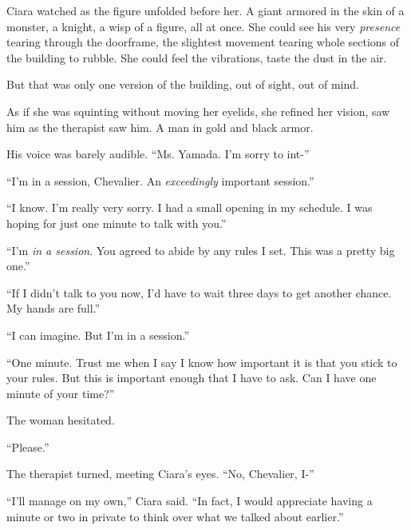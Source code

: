 Ciara watched as the figure unfolded before her.  A giant armored in the skin of a monster, a knight, a wisp of a figure, all at once.  She could see his very \emph{presence} tearing through the doorframe, the slightest movement tearing whole sections of the building to rubble.  She could feel the vibrations, taste the dust in the air.



But that was only one version of the building, out of sight, out of mind.



As if she was squinting without moving her eyelids, she refined her vision, saw him as the therapist saw him.  A man in gold and black armor.



His voice was barely audible.  ``Ms. Yamada.  I'm sorry to int-''



``I'm in a session, Chevalier.  An \emph{exceedingly} important session.''



``I know.  I'm really very sorry.  I had a small opening in my schedule.  I was hoping for just one minute to talk with you.''



``I'm \emph{in a session}.  You agreed to abide by any rules I set.  This was a pretty big one.''



``If I didn't talk to you now, I'd have to wait three days to get another chance.  My hands are full.''



``I can imagine.  But I'm in a session.''



``One minute.  Trust me when I say I know how important it is that you stick to your rules.  But this is important enough that I have to ask.  Can I have one minute of your time?''



The woman hesitated.



``Please.''



The therapist turned, meeting Ciara's eyes.  ``No, Chevalier, I-''



``I'll manage on my own,'' Ciara said.  ``In fact, I would appreciate having a minute or two in private to think over what we talked about earlier.''



